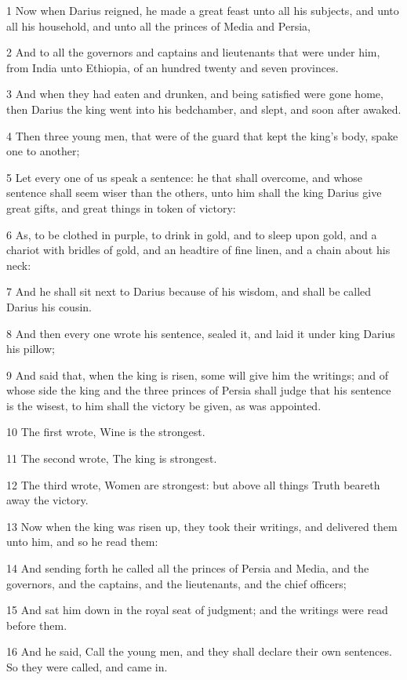 \par 1 Now when Darius reigned, he made a great feast unto all his subjects, and unto all his household, and unto all the princes of Media and Persia,
\par 2 And to all the governors and captains and lieutenants that were under him, from India unto Ethiopia, of an hundred twenty and seven provinces.
\par 3 And when they had eaten and drunken, and being satisfied were gone home, then Darius the king went into his bedchamber, and slept, and soon after awaked.
\par 4 Then three young men, that were of the guard that kept the king's body, spake one to another;
\par 5 Let every one of us speak a sentence: he that shall overcome, and whose sentence shall seem wiser than the others, unto him shall the king Darius give great gifts, and great things in token of victory:
\par 6 As, to be clothed in purple, to drink in gold, and to sleep upon gold, and a chariot with bridles of gold, and an headtire of fine linen, and a chain about his neck:
\par 7 And he shall sit next to Darius because of his wisdom, and shall be called Darius his cousin.
\par 8 And then every one wrote his sentence, sealed it, and laid it under king Darius his pillow;
\par 9 And said that, when the king is risen, some will give him the writings; and of whose side the king and the three princes of Persia shall judge that his sentence is the wisest, to him shall the victory be given, as was appointed.
\par 10 The first wrote, Wine is the strongest.
\par 11 The second wrote, The king is strongest.
\par 12 The third wrote, Women are strongest: but above all things Truth beareth away the victory.
\par 13 Now when the king was risen up, they took their writings, and delivered them unto him, and so he read them:
\par 14 And sending forth he called all the princes of Persia and Media, and the governors, and the captains, and the lieutenants, and the chief officers;
\par 15 And sat him down in the royal seat of judgment; and the writings were read before them.
\par 16 And he said, Call the young men, and they shall declare their own sentences. So they were called, and came in.
